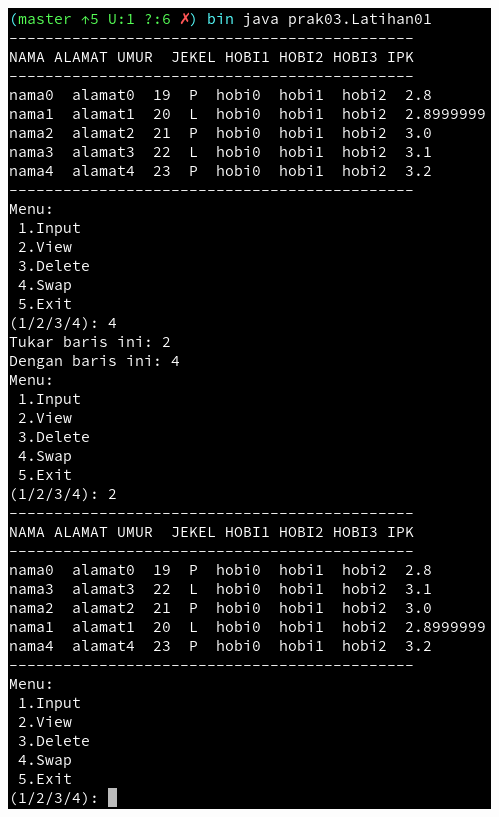 \documentclass[a4paper,12pt]{article}
\begin{document}
\begin{center}
    \includegraphics[scale=.7]{lat.png} 
\end{center}

\newpage
\end{document}
